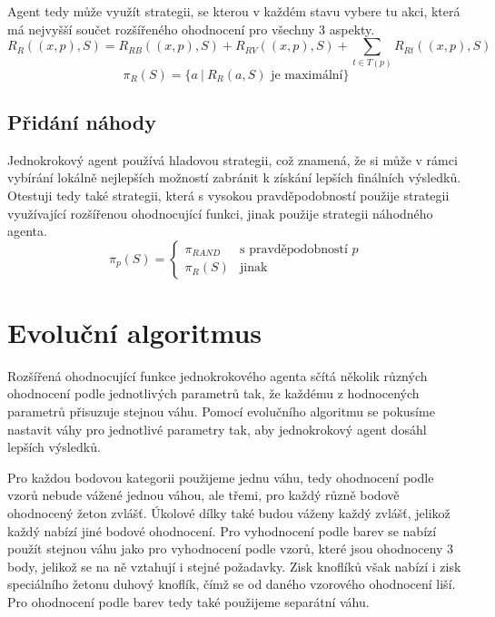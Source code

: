 Agent tedy může využít strategii, se kterou v každém stavu vybere tu akci, která má nejvyšší součet rozšířeného ohodnocení pro všechny 3 aspekty.
\begin{equation}
    R_R((x,p),S) = R_{RB}((x,p),S) + R_{RV}((x,p),S) + \sum_{t\in T(p)}R_{Rt}((x,p),S)
\end{equation}
\begin{equation}
    \pi_R(S) = \{a\ |\ R_R(a,S) \text{ je maximální}\}
\end{equation}

\subsection{Přidání náhody}

Jednokrokový agent používá hladovou strategii, což znamená, že si může v rámci vybírání lokálně nejlepších možností zabránit k získání lepších finálních výsledků. Otestuji tedy také strategii, která s vysokou pravděpodobností použije strategii využívající rozšířenou ohodnocující funkci, jinak použije strategii náhodného agenta.
\begin{equation}
    \pi_p(S) = 
    \begin{cases}
        \pi_{RAND} & \text{s pravděpodobností } p\\
        \pi_{R}(S) & \text{jinak}
    \end{cases}
\end{equation}


\section{Evoluční algoritmus}

Rozšířená ohodnocující funkce jednokrokového agenta sčítá několik různých ohodnocení podle jednotlivých parametrů tak, že každému z hodnocených parametrů přisuzuje stejnou váhu. Pomocí evolučního algoritmu se pokusíme nastavit váhy pro jednotlivé parametry tak, aby jednokrokový agent dosáhl lepších výsledků.

Pro každou bodovou kategorii použijeme jednu váhu, tedy ohodnocení podle vzorů nebude vážené jednou váhou, ale třemi, pro každý různě bodově ohodnocený žeton zvlášť. Úkolové dílky také budou váženy každý zvlášť, jelikož každý nabízí jiné bodové ohodnocení. Pro vyhodnocení podle barev se nabízí použít stejnou váhu jako pro vyhodnocení podle vzorů, které jsou ohodnoceny 3 body, jelikož se na ně vztahují i stejné požadavky. Zisk knoflíků však nabízí i zisk speciálního žetonu duhový knoflík, čímž se od daného vzorového ohodnocení liší. Pro ohodnocení podle barev tedy také použijeme separátní váhu.


